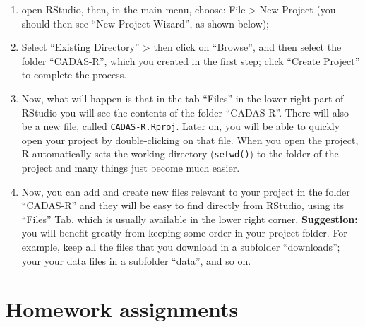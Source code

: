 \documentclass[
]{book}
\providecommand{\tightlist}{%
  \setlength{\itemsep}{0pt}\setlength{\parskip}{0pt}}
\begin{document}
\begin{enumerate}
\def\labelenumi{\arabic{enumi}.}
\tightlist
\item
  open RStudio, then, in the main menu, choose: File \textgreater{} New Project (you should then see ``New Project Wizard'', as shown below);
\item
  Select ``Existing Directory'' \textgreater{} then click on ``Browse'', and then select the folder ``CADAS-R'', which you created in the first step; click ``Create Project'' to complete the process.
\item
  Now, what will happen is that in the tab ``Files'' in the lower right part of RStudio you will see the contents of the folder ``CADAS-R''. There will also be a new file, called \texttt{CADAS-R.Rproj}. Later on, you will be able to quickly open your project by double-clicking on that file. When you open the project, R automatically sets the working directory (\texttt{setwd()}) to the folder of the project and many things just become much easier.
\item
  Now, you can add and create new files relevant to your project in the folder ``CADAS-R'' and they will be easy to find directly from RStudio, using its ``Files'' Tab, which is usually available in the lower right corner. \textbf{Suggestion:} you will benefit greatly from keeping some order in your project folder. For example, keep all the files that you download in a subfolder ``downloads''; your your data files in a subfolder ``data'', and so on.
\end{enumerate}

\hypertarget{homework-assignments}{%
\section{Homework assignments}\label{homework-assignments}}
\end{document}

